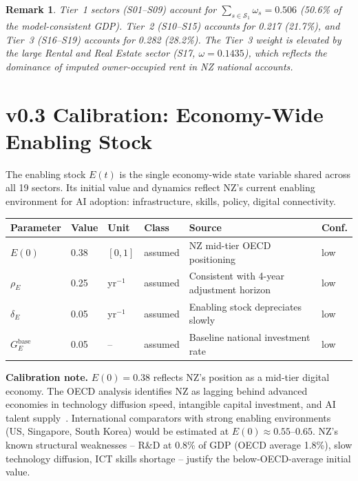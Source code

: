 \documentclass[11pt,a4paper]{article}
\newtheorem{remark}{Remark}
\begin{document}
\begin{remark}
Tier~1 sectors (S01--S09) account for $\sum_{s \in \mathcal{S}_1} \omega_s = 0.506$ (50.6\% of the model-consistent GDP). Tier~2 (S10--S15) accounts for 0.217 (21.7\%), and Tier~3 (S16--S19) accounts for 0.282 (28.2\%). The Tier~3 weight is elevated by the large Rental and Real Estate sector (S17, $\omega = 0.1435$), which reflects the dominance of imputed owner-occupied rent in NZ national accounts.
\end{remark}

\section{v0.3 Calibration: Economy-Wide Enabling Stock}
\label{sec:cal_E}

The enabling stock $E(t)$ is the single economy-wide state variable shared across all 19 sectors. Its initial value and dynamics reflect NZ's current enabling environment for AI adoption: infrastructure, skills, policy, digital connectivity.

\begin{center}
\begin{tabular}{llllll}
\toprule
Parameter & Value & Unit & Class & Source & Conf. \\
\midrule
$E(0)$ & 0.38 & $[0,1]$ & assumed & NZ mid-tier OECD positioning~\cite{oecd2024,nztreasury2024} & low \\
$\rho_E$ & 0.25 & yr$^{-1}$ & assumed & Consistent with 4-year adjustment horizon & low \\
$\delta_E$ & 0.05 & yr$^{-1}$ & assumed & Enabling stock depreciates slowly & low \\
$G_E^{\text{base}}$ & 0.05 & -- & assumed & Baseline national investment rate & low \\
\bottomrule
\end{tabular}
\end{center}

\textbf{Calibration note.} $E(0) = 0.38$ reflects NZ's position as a mid-tier digital economy. The OECD analysis identifies NZ as lagging behind advanced economies in technology diffusion speed, intangible capital investment, and AI talent supply~\cite{oecd2024}. International comparators with strong enabling environments (US, Singapore, South Korea) would be estimated at $E(0) \approx 0.55$--$0.65$. NZ's known structural weaknesses -- R\&D at 0.8\% of GDP (OECD average 1.8\%), slow technology diffusion, ICT skills shortage -- justify the below-OECD-average initial value.
\end{document}
